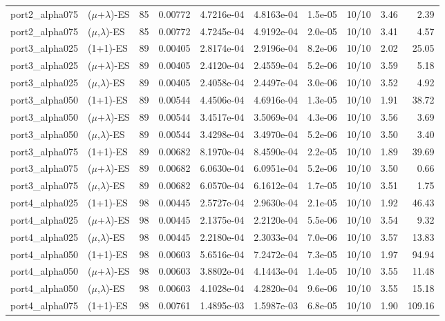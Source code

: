 \begin{tabular}{llrrrrrrrr}
port2\_alpha075 & ($\mu$+$\lambda$)-ES & 85 & 0.00772 & 4.7216e-04 & 4.8163e-04 & 1.5e-05 & 10/10 & 3.46 & 2.39 \\
port2\_alpha075 & ($\mu$,$\lambda$)-ES & 85 & 0.00772 & 4.7245e-04 & 4.9192e-04 & 2.0e-05 & 10/10 & 3.41 & 4.57 \\
port3\_alpha025 & (1+1)-ES & 89 & 0.00405 & 2.8174e-04 & 2.9196e-04 & 8.2e-06 & 10/10 & 2.02 & 25.05 \\
port3\_alpha025 & ($\mu$+$\lambda$)-ES & 89 & 0.00405 & 2.4120e-04 & 2.4559e-04 & 5.2e-06 & 10/10 & 3.59 & 5.18 \\
port3\_alpha025 & ($\mu$,$\lambda$)-ES & 89 & 0.00405 & 2.4058e-04 & 2.4497e-04 & 3.0e-06 & 10/10 & 3.52 & 4.92 \\
port3\_alpha050 & (1+1)-ES & 89 & 0.00544 & 4.4506e-04 & 4.6916e-04 & 1.3e-05 & 10/10 & 1.91 & 38.72 \\
port3\_alpha050 & ($\mu$+$\lambda$)-ES & 89 & 0.00544 & 3.4517e-04 & 3.5069e-04 & 4.3e-06 & 10/10 & 3.56 & 3.69 \\
port3\_alpha050 & ($\mu$,$\lambda$)-ES & 89 & 0.00544 & 3.4298e-04 & 3.4970e-04 & 5.2e-06 & 10/10 & 3.50 & 3.40 \\
port3\_alpha075 & (1+1)-ES & 89 & 0.00682 & 8.1970e-04 & 8.4590e-04 & 2.2e-05 & 10/10 & 1.89 & 39.69 \\
port3\_alpha075 & ($\mu$+$\lambda$)-ES & 89 & 0.00682 & 6.0630e-04 & 6.0951e-04 & 5.2e-06 & 10/10 & 3.50 & 0.66 \\
port3\_alpha075 & ($\mu$,$\lambda$)-ES & 89 & 0.00682 & 6.0570e-04 & 6.1612e-04 & 1.7e-05 & 10/10 & 3.51 & 1.75 \\
port4\_alpha025 & (1+1)-ES & 98 & 0.00445 & 2.5727e-04 & 2.9630e-04 & 2.1e-05 & 10/10 & 1.92 & 46.43 \\
port4\_alpha025 & ($\mu$+$\lambda$)-ES & 98 & 0.00445 & 2.1375e-04 & 2.2120e-04 & 5.5e-06 & 10/10 & 3.54 & 9.32 \\
port4\_alpha025 & ($\mu$,$\lambda$)-ES & 98 & 0.00445 & 2.2180e-04 & 2.3033e-04 & 7.0e-06 & 10/10 & 3.57 & 13.83 \\
port4\_alpha050 & (1+1)-ES & 98 & 0.00603 & 5.6516e-04 & 7.2472e-04 & 7.3e-05 & 10/10 & 1.97 & 94.94 \\
port4\_alpha050 & ($\mu$+$\lambda$)-ES & 98 & 0.00603 & 3.8802e-04 & 4.1443e-04 & 1.4e-05 & 10/10 & 3.55 & 11.48 \\
port4\_alpha050 & ($\mu$,$\lambda$)-ES & 98 & 0.00603 & 4.1028e-04 & 4.2820e-04 & 9.6e-06 & 10/10 & 3.55 & 15.18 \\
port4\_alpha075 & (1+1)-ES & 98 & 0.00761 & 1.4895e-03 & 1.5987e-03 & 6.8e-05 & 10/10 & 1.90 & 109.16 \\

\end{tabular}
